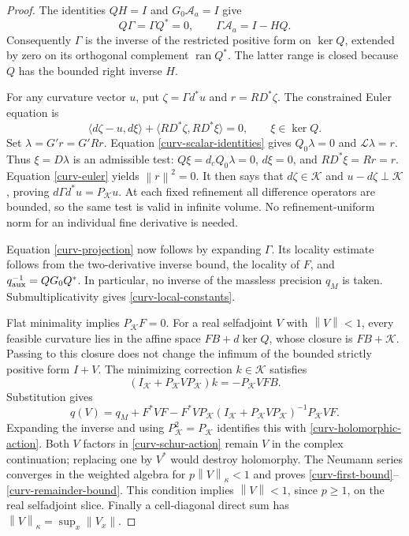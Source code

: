 \documentclass[11pt]{article}
\theoremstyle{remark}
\newcommand{\norm}[1]{\left\|#1\right\|}
\begin{document}
\begin{proof}
The identities $QH=I$ and $G_0\mathcal A_a=I$ give
\begin{equation}\label{curv-constrained-inverse}
 Q\Gamma=\Gamma Q^*=0,\qquad
 \Gamma\mathcal A_a=I-HQ.
\end{equation}
Consequently $\Gamma$ is the inverse of the restricted positive
form on $\ker Q$, extended by zero on its orthogonal complement
$\operatorname{ran}Q^*$. The latter range is closed because $Q$
has the bounded right inverse $H$.

For any curvature vector $u$, put $\zeta=\Gamma d^*u$ and
$r=RD^*\zeta$. The constrained Euler equation is
\begin{equation}\label{curv-euler}
 \langle d\zeta-u,d\xi\rangle
    +\langle RD^*\zeta,RD^*\xi\rangle=0,
       \qquad \xi\in\ker Q.
\end{equation}
Set $\lambda=G'r=G'Rr$. Equation
\eqref{curv-scalar-identities} gives $Q_0\lambda=0$ and
$\mathcal L\lambda=r$. Thus $\xi=D\lambda$ is an admissible
test: $Q\xi=d_cQ_0\lambda=0$, $d\xi=0$, and
$RD^*\xi=Rr=r$. Equation \eqref{curv-euler} yields
$\norm{r}^2=0$. It then says that $d\zeta\in\mathcal K$ and
$u-d\zeta\perp\mathcal K$, proving
$d\Gamma d^*u=P_{\mathcal K}u$. At each fixed refinement all
difference operators are bounded, so the same test is valid in
infinite volume. No refinement-uniform norm for an individual
fine derivative is needed.

Equation \eqref{curv-projection} now follows by expanding $\Gamma$.
Its locality estimate follows from the two-derivative inverse bound,
the locality of $F$, and
$q_{\rm aux}^{-1}=QG_0Q^*$. In particular, no inverse of the
massless precision $q_M$ is taken. Submultiplicativity gives
\eqref{curv-local-constants}.

Flat minimality implies $P_{\mathcal K}F=0$. For a real
selfadjoint $V$ with $\norm{V}<1$, every feasible curvature lies
in the affine space $FB+d\ker Q$, whose closure is
$FB+\mathcal K$. Passing to this closure does not change the
infimum of the bounded strictly positive form $I+V$.
The minimizing correction $k\in\mathcal K$ satisfies
\[
 (I_{\mathcal K}+P_{\mathcal K}VP_{\mathcal K})k
       =-P_{\mathcal K}VFB.
\]
Substitution gives
\begin{equation}\label{curv-schur-action}
 q(V)=q_M+F^*VF-
 F^*VP_{\mathcal K}(I_{\mathcal K}
       +P_{\mathcal K}VP_{\mathcal K})^{-1}
       P_{\mathcal K}VF.
\end{equation}
Expanding the inverse and using $P_{\mathcal K}^2=P_{\mathcal K}$
identifies this with \eqref{curv-holomorphic-action}. Both $V$
factors in \eqref{curv-schur-action} remain $V$ in the complex
continuation; replacing one by $V^*$ would destroy holomorphy.
The Neumann series converges in the weighted algebra for
$p\norm{V}_\kappa<1$ and proves
\eqref{curv-first-bound}--\eqref{curv-remainder-bound}.
This condition implies $\norm{V}<1$, since $p\ge1$, on the real
selfadjoint slice. Finally a cell-diagonal direct sum has
$\norm{V}_\kappa=\sup_x\norm{V_x}$.
\end{proof}
\end{document}
